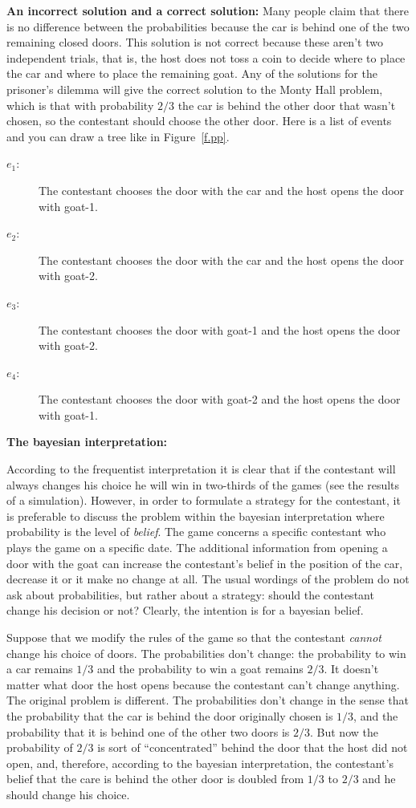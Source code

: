 \textbf{An incorrect solution and a correct solution:} Many people claim that there is no difference between the probabilities because the car is behind one of the two remaining closed doors. This solution is not correct because these aren't two independent trials, that is, the host does not toss a coin to decide where to place the car and where to place the remaining goat. Any of the solutions for the prisoner's dilemma will give the correct solution to the Monty Hall problem, which is that with probability $2/3$ the car is  behind the other door that wasn't chosen, so the contestant should choose the other door. Here is a list of events and you can draw a tree like in Figure~\ref{f.pp}.
\begin{description}
\item[$e_1$:] The contestant chooses the door with the car and the host opens the door with goat-1.
\item[$e_2$:] The contestant chooses the door with the car and the host opens the door with goat-2.
\item[$e_3$:] The contestant chooses the door with goat-1 and the host opens the door with goat-2.
\item[$e_4$:] The contestant chooses the door with goat-2 and the host opens the door with goat-1.
\end{description}


\textbf{The bayesian interpretation:}

According to the frequentist interpretation it is clear that if the contestant will always changes his choice he will win in two-thirds of the games (see the results of a simulation). However, in order to formulate a strategy for the contestant, it is preferable to discuss the problem within the bayesian interpretation where probability is the level of \textit{belief}. The game concerns a specific contestant who plays the game on a specific date. The additional information from opening a door with the goat can increase the contestant's belief in the position of the car, decrease it or it make no change at all. The usual wordings of the problem do not ask about probabilities, but rather about a strategy: should the contestant change his decision or not? Clearly, the intention is for a bayesian belief.

Suppose that we modify the rules of the game so that the contestant \textit{cannot} change his choice of doors. The probabilities don't change: the probability to win a car remains $1/3$ and the probability to win a goat remains $2/3$. It doesn't matter what door the host opens because the contestant can't change anything. The original problem is different. The probabilities don't change in the sense that the probability that the car is behind the door originally chosen is $1/3$, and the probability that it is behind one of the other two doors is $2/3$. But now the probability of $2/3$ is sort of ``concentrated'' behind the door that the host did not open, and, therefore, according to the bayesian interpretation, the contestant's belief that the care is behind the other door is doubled from $1/3$ to $2/3$ and he should change his choice.

